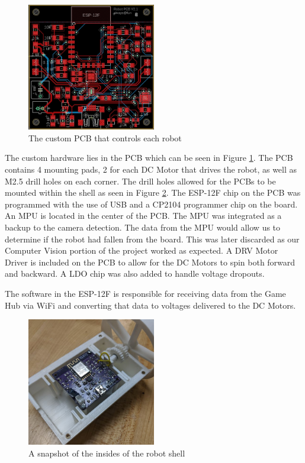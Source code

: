 \documentclass[11pt]{ieeeconf}
\begin{document}
\begin{figure}[H]
\centering
\captionsetup{justification=centering}
\includegraphics[width=0.5\textwidth]{images/FinalPCB.jpg}
\caption{The custom PCB that controls each robot}
\label{PCB}
\end{figure}

The custom hardware lies in the PCB which can be seen in Figure \ref{PCB}. The PCB contains 4 mounting pads, 2 for each DC Motor that drives the robot, as well as M2.5 drill holes on each corner. The drill holes allowed for the PCBs to be mounted within the shell as seen in Figure \ref{shell}. The ESP-12F chip on the PCB was programmed with the use of USB and a CP2104 programmer chip on the board. An MPU is located in the center of the PCB. The MPU was integrated as a backup to the camera detection. The data from the MPU would allow us to determine if the robot had fallen from the board. This was later discarded as our Computer Vision portion of the project worked as expected. A DRV Motor Driver is included on the PCB to allow for the DC Motors to spin both forward and backward. A LDO chip was also added to handle voltage dropouts. 

The software in the ESP-12F is responsible for receiving data from the Game Hub via WiFi and converting that data to voltages delivered to the DC Motors.  

\begin{figure}[H]
\centering
\captionsetup{justification=centering}
\includegraphics[width=0.5\textwidth]{images/Shell.png}
\caption{A snapshot of the insides of the robot shell}
\label{shell}
\end{figure}
\end{document}
